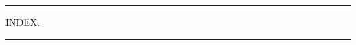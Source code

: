 \documentclass[twoside]{book}
\begin{document}
\begin{center}\rule{0.5cm}{1pt.}\end{center}

\pagebreak


\thispagestyle{empty}

\begin{center}

\begin{Large}INDEX.\end{Large}

\rule{0.5cm}{1pt.}

\vspace*{\fill}

\begin{tiny}

\begin{tabular}{l l}


\end{tabular}
\end{tiny}
\end{center}
\end{document}
